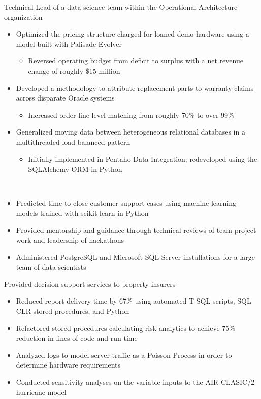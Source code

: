 \documentclass[10pt,a4paper,sans]{moderncv}        %
\begin{document}
{Technical Lead of a data science team within the Operational Architecture organization
\begin{itemize}
	\item Optimized the pricing structure charged for loaned demo hardware using a model built with Palisade Evolver
	\begin{itemize}
		\item Reversed operating budget from deficit to surplus with a net revenue change of roughly \$15 million
	\end{itemize}
	\item Developed a methodology to attribute replacement parts to warranty claims across disparate Oracle systems
	\begin{itemize}
		\item Increased order line level matching from roughly 70\% to over 99\%
	\end{itemize}
	\item Generalized moving data between heterogeneous relational databases in a multithreaded load-balanced pattern
	\begin{itemize}
		\item Initially implemented in Pentaho Data Integration; redeveloped using the SQLAlchemy ORM in Python
	\end{itemize}
􏰂	\item Predicted time to close customer support cases using machine learning models trained with scikit-learn in Python
	\item Provided mentorship and guidance through technical reviews of team project work and leadership of hackathons
	\item Administered PostgreSQL and Microsoft SQL Server installations for a large team of data scientists
\end{itemize}}

{Provided decision support services to property insurers
\begin{itemize}
	\item Reduced report delivery time by 67\% using automated T-SQL scripts, SQL CLR stored procedures, and Python
	\item Refactored stored procedures calculating risk analytics to achieve 75\% reduction in lines of code and run time
	\item Analyzed logs to model server traffic as a Poisson Process in order to determine hardware requirements
	\item Conducted sensitivity analyses on the variable inputs to the AIR CLASIC/2 hurricane model
\end{itemize}}
\end{document}
